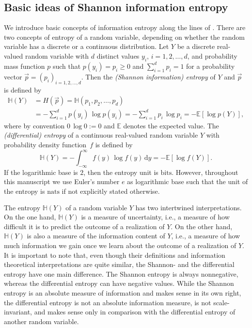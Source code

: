 \documentclass[smallextended]{svjour3}
\newcommand{\E}{\mathbb{E}}
\renewcommand{\H}{\mathbb{H}}
\newcommand{\suml}{\sum\limits}
\newcommand{\dd}[1]{\,\mathrm{d}#1}
\newcommand{\bits}{\mathrm{bits}}
\newcommand{\nats}{\mathrm{nats}}
\newcommand{\ie}{i.e.}
\newcommand{\pdf}{probability density function}
\begin{document}
\subsection{Basic ideas of Shannon information entropy}
\label{sec:entropy_basics}

We introduce basic concepts of information entropy along the lines of \citet{Cover2006}.
There are two concepts of entropy of a random variable, depending on whether the random variable has a discrete or a continuous distribution.
Let $Y$ be a discrete real-valued random variable with $d$ distinct values $y_i,\,i=1,2,\ldots, d$, and probability mass function $p$ such that $p(y_i) = p_i\geq 0$ and $\sum_{i=1}^d p_i = 1$ for a probability vector $\vec{p}=(p_i)_{i=1, 2, \ldots,d}$.
Then the \emph{(Shannon information) entropy} of $Y$ and $\vec{p}$ is defined by
\begin{equation*}
  \begin{aligned}
    \H(Y) &= H(\vec{p}) = \H(p_1,p_2,\ldots,p_d)\\
    &= -\suml_{i=1}^d p(y_i)\,\log p(y_i)
    = -\suml_{i=1}^d p_i\,\log p_i
    = -\E\left[\log p(Y)\right],
  \end{aligned}
\end{equation*}
where by convention $0\,\log 0:=0$ and $\E$ denotes the expected value.
The \emph{(differential) entropy} of a continuous real-valued random variable $Y$ with \pdf\ $f$ is defined by
\begin{equation*}
	\H(Y) = -\int_{-\infty}^{\infty} f(y)\,\log f(y)\dd{y} = -\E\left[\log f(Y)\right].
\end{equation*}
If the logarithmic base is $2$, then the entropy unit is $\bits$.
However, throughout this manuscript we use Euler's number $e$ as logarithmic base such that the unit of the entropy is $\nats$ if not explicitly stated otherwise.

The entropy $\H(Y)$ of a random variable $Y$ has two intertwined interpretations.
On the one hand, $\H(Y)$ is a measure of uncertainty, \ie, a measure of how difficult it is to predict the outcome of a realization of $Y$.
On the other hand, $\H(Y)$ is also a measure of the information content of $Y$, \ie, a measure of how much information we gain once we learn about the outcome of a realization of $Y$.
It is important to note that, even though their definitions and information theoretical interpretations are quite similar, the Shannon- and the differential entropy have one main difference.
The Shannon entropy is always nonnegative, whereas the differential entropy can have negative values.
While the Shannon entropy is an absolute measure of information and makes sense in its own right, the differential entropy is not an absolute information measure, is not scale-invariant, and makes sense only in comparison with the differential entropy of another random variable.
\end{document}
